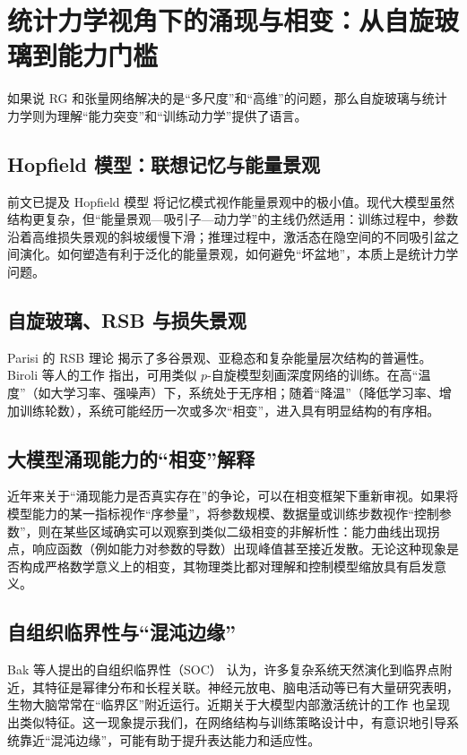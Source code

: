 \documentclass[12pt,a4paper]{article}
\begin{document}
\section{统计力学视角下的涌现与相变：从自旋玻璃到能力门槛}

如果说 RG 和张量网络解决的是“多尺度”和“高维”的问题，那么自旋玻璃与统计力学则为理解“能力突变”和“训练动力学”提供了语言。

\subsection{Hopfield 模型：联想记忆与能量景观}

前文已提及 Hopfield 模型\cite{hopfield1982neural} 将记忆模式视作能量景观中的极小值。现代大模型虽然结构更复杂，但“能量景观—吸引子—动力学”的主线仍然适用：训练过程中，参数沿着高维损失景观的斜坡缓慢下滑；推理过程中，激活态在隐空间的不同吸引盆之间演化。如何塑造有利于泛化的能量景观，如何避免“坏盆地”，本质上是统计力学问题。

\subsection{自旋玻璃、RSB 与损失景观}

Parisi 的 RSB 理论\cite{parisi1980order} 揭示了多谷景观、亚稳态和复杂能量层次结构的普遍性。Biroli 等人的工作\cite{biroli2024energy} 指出，可用类似 $p$-自旋模型刻画深度网络的训练。在高“温度”（如大学习率、强噪声）下，系统处于无序相；随着“降温”（降低学习率、增加训练轮数），系统可能经历一次或多次“相变”，进入具有明显结构的有序相。

\subsection{大模型涌现能力的“相变”解释}

近年来关于“涌现能力是否真实存在”的争论\cite{schaeffer2024are}，可以在相变框架下重新审视。如果将模型能力的某一指标视作“序参量”，将参数规模、数据量或训练步数视作“控制参数”，则在某些区域确实可以观察到类似二级相变的非解析性：能力曲线出现拐点，响应函数（例如能力对参数的导数）出现峰值甚至接近发散。无论这种现象是否构成严格数学意义上的相变，其物理类比都对理解和控制模型缩放具有启发意义。

\subsection{自组织临界性与“混沌边缘”}

Bak 等人提出的自组织临界性（SOC）\cite{bak1987self} 认为，许多复杂系统天然演化到临界点附近，其特征是幂律分布和长程关联。神经元放电、脑电活动等已有大量研究表明，生物大脑常常在“临界区”附近运行\cite{chialvo2010emergent}。近期关于大模型内部激活统计的工作\cite{zimmern2024large} 也呈现出类似特征。这一现象提示我们，在网络结构与训练策略设计中，有意识地引导系统靠近“混沌边缘”，可能有助于提升表达能力和适应性。
\end{document}
